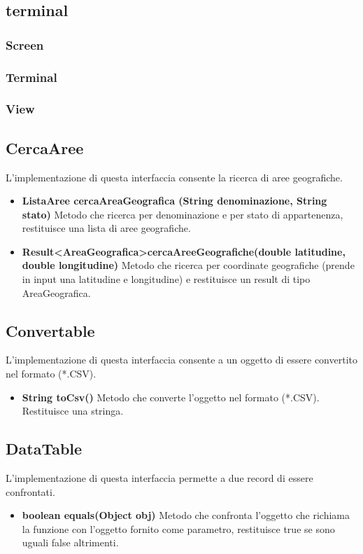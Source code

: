 \documentclass[a4paper, 12pt]{report}
\begin{document}
			\subsection{terminal}
				\subsubsection{Screen}
				\subsubsection{Terminal}
				\subsubsection{View}

			\subsection{CercaAree}
			L'implementazione di questa interfaccia consente la ricerca di aree geografiche.
			\begin{itemize}
				\item \textbf{ListaAree cercaAreaGeografica (String denominazione, String stato)}
				Metodo che ricerca per denominazione e per stato di appartenenza, restituisce una lista di aree geografiche.
				\item\textbf{Result\textless AreaGeografica\textgreater cercaAreeGeografiche(double latitudine, double longitudine)}
				Metodo che ricerca per coordinate geografiche (prende in input una latitudine e longitudine) e restituisce un result di tipo AreaGeografica.
			\end{itemize}

			\subsection{Convertable}
			L'implementazione di questa interfaccia consente a un oggetto di essere convertito nel formato (*.CSV).
			\begin{itemize}
				\item \textbf{String toCsv()}
				Metodo che converte l'oggetto nel formato (*.CSV). Restituisce una stringa.
			\end{itemize}
			\subsection{DataTable}
			L'implementazione di questa interfaccia permette a due record di essere confrontati.
			\begin{itemize}
				\item\textbf{boolean equals(Object obj)}
				Metodo che confronta l'oggetto che richiama la funzione con l'oggetto fornito come parametro, restituisce true se sono uguali false altrimenti.
			\end{itemize}
\end{document}
